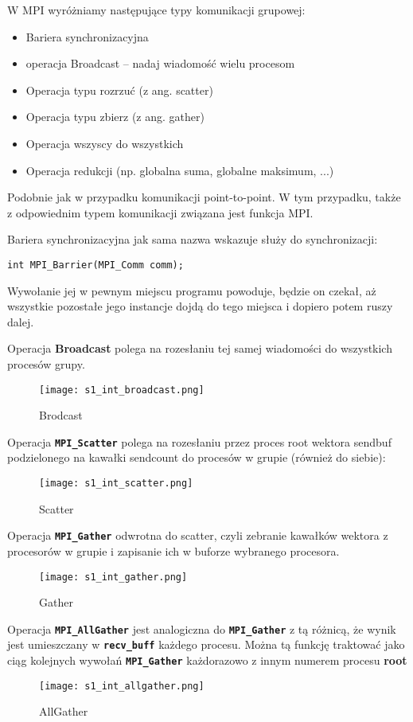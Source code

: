 W MPI wyróżniamy następujące typy komunikacji grupowej: 
\begin{itemize}
\item Bariera synchronizacyjna 
\item operacja Broadcast -- nadaj wiadomość wielu procesom 
\item Operacja typu rozrzuć (z ang. scatter) 
\item Operacja typu zbierz (z ang. gather) 
\item Operacja wszyscy do wszystkich 
\item Operacja redukcji (np. globalna suma, globalne maksimum, ...)
\end{itemize}

Podobnie jak w przypadku komunikacji point-to-point. W tym przypadku, także z odpowiednim typem komunikacji związana jest funkcja MPI.

Bariera synchronizacyjna jak sama nazwa wskazuje służy do synchronizacji:

\texttt{int MPI\_Barrier(MPI\_Comm comm);}

Wywołanie jej w pewnym miejscu programu powoduje, będzie on czekał, aż wszystkie pozostałe jego instancje dojdą do tego miejsca i dopiero potem ruszy dalej.

Operacja \textbf{Broadcast} polega na rozesłaniu tej samej wiadomości do wszystkich procesów grupy.
\begin{figure}[H]
\caption{Brodcast}
\texttt{[image: s1\_int\_broadcast.png]}
\end{figure}

Operacja \texttt{\textbf{MPI\_Scatter}} polega na rozesłaniu przez proces root wektora sendbuf podzielonego na kawałki sendcount do procesów w grupie (również do siebie):
\begin{figure}[H]
\caption{Scatter}
\texttt{[image: s1\_int\_scatter.png]}
\end{figure}

Operacja \texttt{\textbf{MPI\_Gather}} odwrotna do scatter, czyli zebranie kawałków wektora z procesorów w grupie i zapisanie ich w buforze wybranego procesora.
\begin{figure}[H]
\caption{Gather}
\texttt{[image: s1\_int\_gather.png]}
\end{figure}

Operacja \texttt{\textbf{MPI\_AllGather}} jest analogiczna do \texttt{\textbf{MPI\_Gather}} z tą różnicą, że wynik jest umieszczany w \texttt{\textbf{recv\_buff}} każdego procesu. Można tą funkcję traktować jako ciąg kolejnych wywołań \texttt{\textbf{MPI\_Gather}} każdorazowo z innym numerem procesu \textbf{root}
\begin{figure}[H]
\caption{AllGather}
\texttt{[image: s1\_int\_allgather.png]}
\end{figure}

